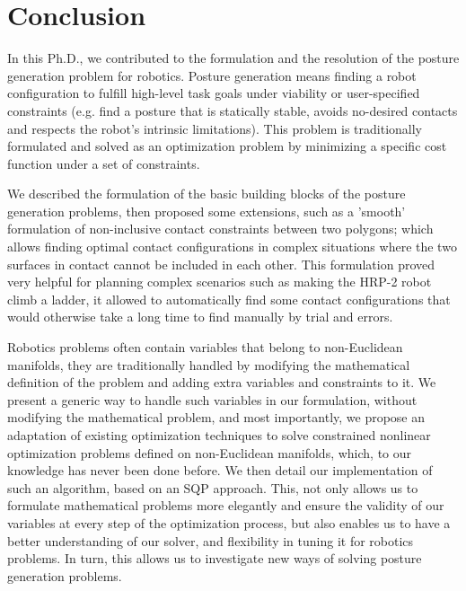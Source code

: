 

\chapter*{Conclusion}
\label{cha:conclusion}

In this Ph.D., we contributed to the formulation and the resolution of the posture generation problem for robotics.
Posture generation means finding a robot configuration to fulfill high-level task goals under viability or user-specified constraints (e.g. find a posture that is statically stable, avoids no-desired contacts and respects the robot's intrinsic limitations).
This problem is traditionally formulated and solved as an optimization problem by minimizing a specific cost function under a set of constraints.

We described the formulation of the basic building blocks of the posture generation problems, then proposed some extensions, such as a 'smooth' formulation of non-inclusive contact constraints between two polygons; which allows finding optimal contact configurations in complex situations where the two surfaces in contact cannot be included in each other.
This formulation proved very helpful for planning complex scenarios such as making the HRP-2 robot climb a ladder, it allowed to automatically find some contact configurations that would otherwise take a long time to find manually by trial and errors.

Robotics problems often contain variables that belong to non-Euclidean manifolds, they are traditionally handled by modifying the mathematical definition of the problem and adding extra variables and constraints to it.
We present a generic way to handle such variables in our formulation, without modifying the mathematical problem, and most importantly, we propose an adaptation of existing optimization techniques to solve constrained nonlinear optimization problems defined on non-Euclidean manifolds, which, to our knowledge has never been done before.
We then detail our implementation of such an algorithm, based on an SQP approach.
This, not only allows us to formulate mathematical problems more elegantly and ensure the validity of our variables at every step of the optimization process, but also enables us to have a better understanding of our solver, and flexibility in tuning it for robotics problems.
In turn, this allows us to investigate new ways of solving posture generation problems.

